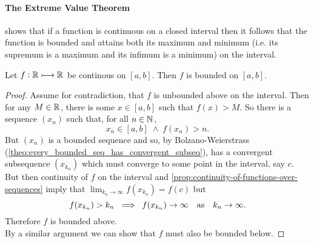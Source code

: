 \documentclass[../MathsNotesBase.tex]{subfiles}
\begin{document}
	\paragraph{The Extreme Value Theorem} shows that if a function is continuous on a closed interval then it follows that the function is bounded and attains both its maximum and minimum (i.e. its supremum is a maximum and its infimum is a minimum) on the interval.

	\bigskip
	\begin{lemma}\label{lem:continuity-on-closed-interval-implies-boundedness}
		Let $f: \mathbb{R}^{} \longmapsto \mathbb{R}^{} $ be continous on ${ [a,b] }$. Then $f$ is bounded on ${ [a,b] }$.
	\end{lemma}
	\begin{proof}
		Assume for contradiction, that $f$ is unbounded above on the interval. Then for any ${ M \in \mathbb{R}^{} }$, there is some ${ x \in [a,b] }$ such that ${ f(x) > M }$. So there is a sequence $(x_n)$ such that, for all ${ n \in \mathbb{N}^{} }$,
		\[ x_n \in [a,b] \; \land \; f(x_n) > n. \]
		But $(x_n)$ is a bounded sequence and so, by Bolzano-Weierstrass (\autoref{theo:every_bounded_seq_has_convergent_subseq}), has a convergent subsequence $(x_{k_n})$ which must converge to some point in the interval, say $c$. But then continuity of $f$ on the interval and \autoref{prop:continuity-of-functions-over-sequences} imply that ${ \lim_{k_n \to \infty} f(x_{k_n}) = f(c) }$ but
		\[ f(x_{k_n}) > k_n \; \implies \; f(x_{k_n}) \to \infty \hspace{10pt}\text{as}\hspace{10pt} k_n \to \infty. \]
		Therefore $f$ is bounded above.\\
		By a similar argument we can show that $f$ must also be bounded below.
	\end{proof}
\end{document}
